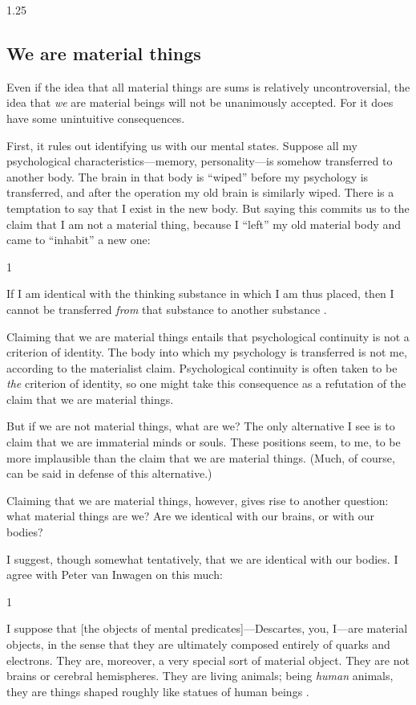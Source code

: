 \documentclass[12pt,twoside]{reedfancy}
\newenvironment{squote}{%
	\begin{spacing}{1}
	\begin{list}{}{%
	\setlength{\labelwidth}{0pt}%
	\rightmargin\leftmargin%
	}
	\item\relax
	}{%
	\end{list}%
	\end{spacing}
	}
\begin{document}
\begin{spacing}{1.25}
\subsection{We are material things}
\label{material-beings}
Even if the idea that all material things are sums is relatively
uncontroversial, the idea that {\em we} are material beings will not
be unanimously accepted.  For it does have some unintuitive
consequences.

First, it rules out identifying us with our mental states.  Suppose
all my psychological characteristics---memory, personality---is
somehow transferred to another body.  The brain in that body is
``wiped'' before my psychology is transferred, and after the operation
my old brain is similarly wiped.  There is a temptation to say that I
exist in the new body.  But saying this commits us to the claim that I
am not a material thing, because I ``left'' my old material body and
came to ``inhabit'' a new one:

\begin{squote}
 If I am identical with the thinking substance in which I am thus
 placed, then I cannot be transferred {\em from} that substance to
 another substance \citep[107]{chisholm1979}.
\end{squote}

Claiming that we are material things entails that psychological
continuity is not a criterion of identity.  The body into which my
psychology is transferred is not me, according to the materialist
claim.  Psychological continuity is often taken to be {\em the}
criterion of identity, so one might take this consequence as a
refutation of the claim that we are material things.

But if we are not material things, what are we?  The only alternative
I see is to claim that we are immaterial minds or souls.  These
positions seem, to me, to be more implausible than the claim that we
are material things.  (Much, of course, can be said in defense of this
alternative.)

Claiming that we are material things, however, gives rise to another
question: what material things are we?  Are we identical with our
brains, or with our bodies?

I suggest, though somewhat tentatively, that we are identical with our
bodies.  I agree with Peter van Inwagen on this much:

\begin{squote}
I suppose that [the objects of mental predicates]---Descartes, you,
I---are material objects, in the sense that they are ultimately
composed entirely of quarks and electrons.  They are, moreover, a very
special sort of material object.  They are not brains or cerebral
hemispheres.  They are living animals; being {\em human} animals, they
are things shaped roughly like statues of human beings
\citeyearpar[6]{inwagen1995}.
\end{squote}


\end{spacing}
\end{document}
